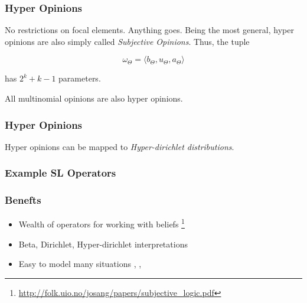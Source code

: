 \documentclass{beamer}
\begin{document}

\begin{frame}
\frametitle{Hyper Opinions}

No restrictions on focal elements. Anything goes. Being the most general, hyper
opinions are also simply called \emph{Subjective Opinions}. Thus, the tuple

$$
\omega_\Theta = \langle b_\Theta, u_\Theta, a_\Theta \rangle
$$

has $2^{k} + k - 1$ parameters.

All multinomial opinions are also hyper opinions.

\end{frame}


\begin{frame}
\frametitle{Hyper Opinions}

Hyper opinions can be mapped to \emph{Hyper-dirichlet distributions}.

\end{frame}



\begin{frame}
\frametitle{Example SL Operators}


\end{frame}


\begin{frame}
\frametitle{Benefts}

\begin{itemize}
  \item Wealth of operators for working with beliefs
     \footnote{\url{http://folk.uio.no/josang/papers/subjective_logic.pdf}}
  \item Beta, Dirichlet, Hyper-dirichlet interpretations
  \item Easy to model many situations
    \cite{josang2008conditional}, \cite{josang2006trust}, \cite{kent2010application}
\end{itemize}

\end{frame}
\end{document}
